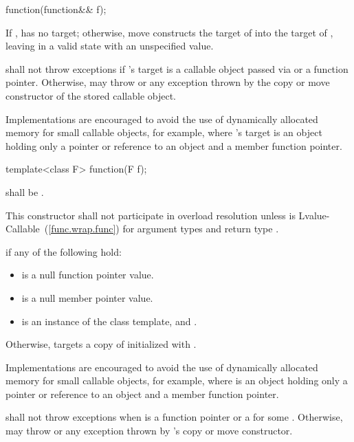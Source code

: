 %
\begin{itemdecl}
function(function&& f);
\end{itemdecl}

\begin{itemdescr}
\pnum
\effects If ,  has
no target; otherwise, move constructs the target of 
into the target of , leaving  in
a valid state with an unspecified value.

\pnum
\throws shall not throw exceptions if 's target is
a callable object passed via  or
a function pointer. Otherwise, may throw  or
any exception thrown by the copy or move constructor
of the stored callable object.
\begin{note} Implementations are encouraged to avoid the use of
dynamically allocated memory for small callable objects, for example,
where 's target is an object holding only a pointer or reference
to an object and a member function pointer. \end{note}
\end{itemdescr}

%
\begin{itemdecl}
template<class F> function(F f);
\end{itemdecl}

\begin{itemdescr}
\pnum
\requires {} shall be .

\pnum
\remarks This constructor shall not participate in overload resolution unless
 is Lvalue-Callable~(\ref{func.wrap.func}) for argument types
 and return type .

\pnum
\postconditions {} if any of the following hold:
\begin{itemize}
\item {} is a null function pointer value.
\item {} is a null member pointer value.
\item {} is an instance of the  class template, and
  .
\end{itemize}

\pnum
Otherwise,  targets a copy of 
initialized with .
\begin{note} Implementations are encouraged to avoid the use of
dynamically allocated memory for small callable objects, for example,
where  is an object holding only a pointer or
reference to an object and a member function pointer. \end{note}

\pnum
\throws shall not throw exceptions when  is a function pointer
or a  for some . Otherwise,
may throw  or any exception thrown by 's copy
or move constructor.
\end{itemdescr}

